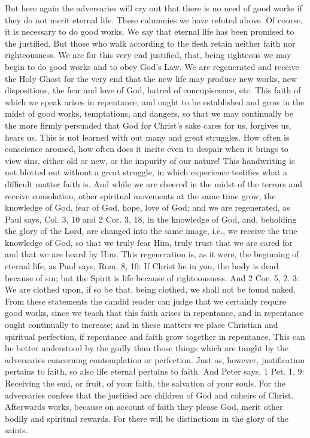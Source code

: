 But here again the adversaries will cry out that there is no need of
good works if they do not merit eternal life.  These calumnies we
have refuted above.  Of course, it is necessary to do good works.  We
say that eternal life has been promised to the justified.  But those
who walk according to the flesh retain neither faith nor
righteousness.  We are for this very end justified, that, being
righteous we may begin to do good works and to obey God's Law.  We
are regenerated and receive the Holy Ghost for the very end that the
new life may produce new works, new dispositions, the fear and love
of God, hatred of concupiscence, etc. This faith of which we speak
arises in repentance, and ought to be established and grow in the
midst of good works, temptations, and dangers, so that we may
continually be the more firmly persuaded that God for Christ's sake
cares for us, forgives us, hears us.  This is not learned with out
many and great struggles.  How often is conscience aroused, how often
does it incite even to despair when it brings to view sins, either
old or new, or the impurity of our nature!  This handwriting is not
blotted out without a great struggle, in which experience testifies
what a difficult matter faith is.  And while we are cheered in the
midst of the terrors and receive consolation, other spiritual
movements at the same time grow, the knowledge of God, fear of God,
hope, love of God; and we are regenerated, as Paul says, Col. 3, 10
and 2 Cor. 3, 18, in the knowledge of God, and, beholding the glory
of the Lord, are changed into the same image, i.e., we receive the
true knowledge of God, so that we truly fear Him, truly trust that we
are cared for and that we are heard by Him.  This regeneration is, as
it were, the beginning of eternal life, as Paul says, Rom. 8, 10: If
Christ be in you, the body is dead because of sin; but the Spirit is
life because of righteousness.  And 2 Cor. 5, 2. 3: We are clothed
upon, if so be that, being clothed, we shall not be found naked.
From these statements the candid reader can judge that we certainly
require good works, since we teach that this faith arises in
repentance, and in repentance ought continually to increase; and in
these matters we place Christian and spiritual perfection, if
repentance and faith grow together in repentance.  This can be better
understood by the godly than those things which are taught by the
adversaries concerning contemplation or perfection.  Just as, however,
justification pertains to faith, so also life eternal pertains to
faith.  And Peter says, 1 Pet. 1, 9: Receiving the end, or fruit, of
your faith, the salvation of your souls.  For the adversaries confess
that the justified are children of God and coheirs of Christ.
Afterwards works, because on account of faith they please God, merit
other bodily and spiritual rewards.  For there will be distinctions
in the glory of the saints.

